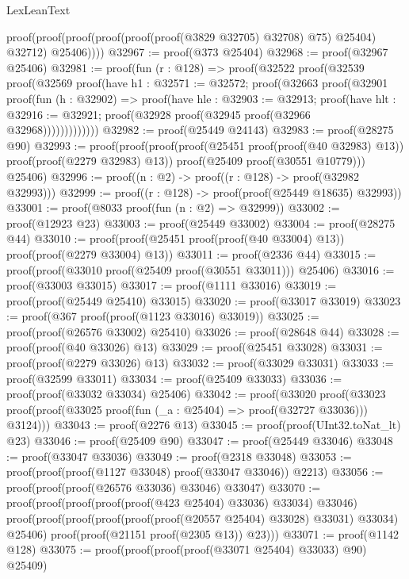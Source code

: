 \begin{lexlean}{LexLeanText}
\begin{coremodule}
              proof(proof(proof(proof(proof(proof(@3829 @32705) @32708) @75) @25404) @32712)
                  @25406))))
@32967 := proof(@373 @25404)
@32968 := proof(@32967 @25406)
@32981 := proof(fun (r : @128) =>
    proof(@32522
        proof(@32539
            proof(@32569
                proof(have h1 : @32571 := @32572;
                  proof(@32663
                      proof(@32901
                          proof(fun (h : @32902) =>
                            proof(have hle : @32903 := @32913;
                              proof(have hlt : @32916 := @32921;
                                proof(@32928 proof(@32945 proof(@32966 @32968)))))))))))))
@32982 := proof(@25449 @24143)
@32983 := proof(@28275 @90)
@32993 := proof(proof(proof(proof(@25451 proof(proof(@40 @32983) @13))
          proof(proof(@2279 @32983) @13))
        proof(@25409 proof(@30551 @10779)))
      @25406)
@32996 := proof((n : @2) -> proof((r : @128) -> proof(@32982 @32993)))
@32999 := proof((r : @128) -> proof(proof(@25449 @18635) @32993))
@33001 := proof(@8033 proof(fun (n : @2) => @32999))
@33002 := proof(@12923 @23)
@33003 := proof(@25449 @33002)
@33004 := proof(@28275 @44)
@33010 := proof(proof(@25451 proof(proof(@40 @33004) @13)) proof(proof(@2279 @33004) @13))
@33011 := proof(@2336 @44)
@33015 := proof(proof(@33010 proof(@25409 proof(@30551 @33011))) @25406)
@33016 := proof(@33003 @33015)
@33017 := proof(@1111 @33016)
@33019 := proof(proof(@25449 @25410) @33015)
@33020 := proof(@33017 @33019)
@33023 := proof(@367 proof(proof(@1123 @33016) @33019))
@33025 := proof(proof(@26576 @33002) @25410)
@33026 := proof(@28648 @44)
@33028 := proof(proof(@40 @33026) @13)
@33029 := proof(@25451 @33028)
@33031 := proof(proof(@2279 @33026) @13)
@33032 := proof(@33029 @33031)
@33033 := proof(@32599 @33011)
@33034 := proof(@25409 @33033)
@33036 := proof(proof(@33032 @33034) @25406)
@33042 := proof(@33020
      proof(@33023 proof(proof(@33025 proof(fun (_a : @25404) => proof(@32727 @33036))) @3124)))
@33043 := proof(@2276 @13)
@33045 := proof(proof(UInt32.toNat_lt) @23)
@33046 := proof(@25409 @90)
@33047 := proof(@25449 @33046)
@33048 := proof(@33047 @33036)
@33049 := proof(@2318 @33048)
@33053 := proof(proof(proof(@1127 @33048) proof(@33047 @33046)) @2213)
@33056 := proof(proof(proof(@26576 @33036) @33046) @33047)
@33070 := proof(proof(proof(proof(proof(@423 @25404) @33036) @33034) @33046)
      proof(proof(proof(proof(proof(proof(@20557 @25404) @33028) @33031) @33034) @25406)
          proof(proof(@21151 proof(@2305 @13)) @23)))
@33071 := proof(@1142 @128)
@33075 := proof(proof(proof(proof(@33071 @25404) @33033) @90) @25409)

\end{coremodule}
\end{lexlean}
